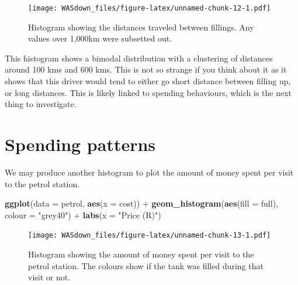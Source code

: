 \documentclass[]{book}
\newenvironment{Shaded}{\begin{snugshade}}{\end{snugshade}}
\newcommand{\KeywordTok}[1]{\textcolor[rgb]{0.13,0.29,0.53}{\textbf{{#1}}}}
\newcommand{\DataTypeTok}[1]{\textcolor[rgb]{0.13,0.29,0.53}{{#1}}}
\newcommand{\DecValTok}[1]{\textcolor[rgb]{0.00,0.00,0.81}{{#1}}}
\newcommand{\StringTok}[1]{\textcolor[rgb]{0.31,0.60,0.02}{{#1}}}
\newcommand{\NormalTok}[1]{{#1}}
\theoremstyle{definition}
\theoremstyle{definition}
\theoremstyle{remark}
\begin{document}
\begin{Shaded}
\end{Shaded}

\begin{figure}[htbp]
\centering
\texttt{[image: WASdown\_files/figure-latex/unnamed-chunk-12-1.pdf]}
\caption{\label{fig:unnamed-chunk-12}Histogram showing the distances
traveled between fillings. Any values over 1,000km were subsetted out.}
\end{figure}

This histogram shows a bimodal distribution with a clustering of
distances around 100 kms and 600 kms. This is not so strange if you
think about it as it shows that this driver would tend to either go
short distance between filling up, or long distances. This is likely
linked to spending behaviours, which is the next thing to investigate.

\section{Spending patterns}\label{spending-patterns}

We may produce another histogram to plot the amount of money spent per
visit to the petrol station.

\begin{Shaded}
\begin{Highlighting}[]
\KeywordTok{ggplot}\NormalTok{(}\DataTypeTok{data =} \NormalTok{petrol, }\KeywordTok{aes}\NormalTok{(}\DataTypeTok{x =} \NormalTok{cost)) +}
\StringTok{  }\KeywordTok{geom_histogram}\NormalTok{(}\KeywordTok{aes}\NormalTok{(}\DataTypeTok{fill =} \NormalTok{full), }\DataTypeTok{colour =} \StringTok{"grey40"}\NormalTok{) +}
\StringTok{  }\KeywordTok{labs}\NormalTok{(}\DataTypeTok{x =} \StringTok{"Price (R)"}\NormalTok{)}
\end{Highlighting}
\end{Shaded}

\begin{figure}[htbp]
\centering
\texttt{[image: WASdown\_files/figure-latex/unnamed-chunk-13-1.pdf]}
\caption{\label{fig:unnamed-chunk-13}Histogram showing the amount of money
spent per visit to the petrol station. The colours show if the tank was
filled during that visit or not.}
\end{figure}
\end{document}
